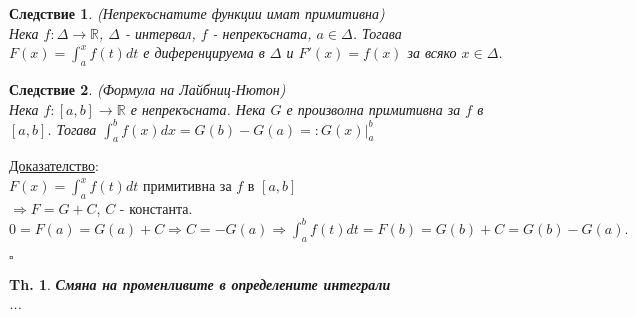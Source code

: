 \documentclass[12pt]{article}
\newtheorem{corollary}{Следствие}
\newtheorem{theorem}{Th.}
\begin{document}
	\begin{corollary} (Непрекъснатите функции имат примитивна)\\
		Нека $f:\Delta\to\mathbb{R}$, $\Delta$ - интервал, $f$ - непрекъсната, $a\in\Delta$. Тогава $F(x) = \int_{a}^{x}f(t)dt$ е диференцируема в $\Delta$ и $F'(x)=f(x)$ за всяко $x\in\Delta$.
	\end{corollary}
	\begin{corollary} (Формула на Лайбниц-Нютон)\\
		Нека $f:[a,b]\to\mathbb{R}$ е непрекъсната. Нека $G$ е произволна примитивна за $f$ в $[a,b]$. Тогава $\int_{a}^{b}f(x)dx=G(b) - G(a) =: G(x)\biggr\rvert_{a}^{b}$
	\end{corollary}
	\underline{Доказателство}:\\
	$F(x) = \int_{a}^{x}f(t)dt$ примитивна за $f$ в $[a,b]$\\
	$\Rightarrow F = G + C$, $C$ - константа.\\
	$0=F(a)=G(a)+C\Rightarrow C=-G(a)\Rightarrow\int_{a}^{b}f(t)dt=F(b)=G(b)+C=G(b)-G(a).$\\
	\begin{flushright}
		$\square$
	\end{flushright}
	
	\begin{theorem} \textbf{Смяна на променливите в определените интеграли}\\
		...
		
	\end{theorem}
\end{document}
